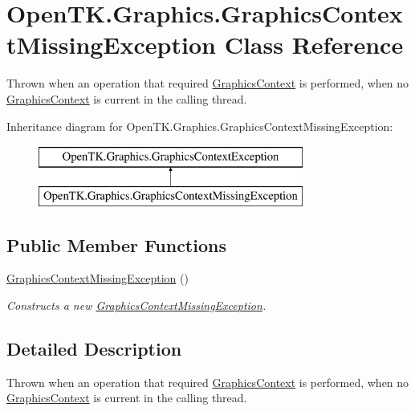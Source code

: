 \hypertarget{class_open_t_k_1_1_graphics_1_1_graphics_context_missing_exception}{\section{Open\-T\-K.\-Graphics.\-Graphics\-Context\-Missing\-Exception Class Reference}
\label{class_open_t_k_1_1_graphics_1_1_graphics_context_missing_exception}
}


Thrown when an operation that required \hyperlink{class_open_t_k_1_1_graphics_1_1_graphics_context}{Graphics\-Context} is performed, when no \hyperlink{class_open_t_k_1_1_graphics_1_1_graphics_context}{Graphics\-Context} is current in the calling thread.  


Inheritance diagram for Open\-T\-K.\-Graphics.\-Graphics\-Context\-Missing\-Exception\-:\begin{figure}[H]
\begin{center}
\leavevmode
\includegraphics[height=2.000000cm]{class_open_t_k_1_1_graphics_1_1_graphics_context_missing_exception}
\end{center}
\end{figure}
\subsection*{Public Member Functions}
\begin{DoxyCompactItemize}
\item 
\hyperlink{class_open_t_k_1_1_graphics_1_1_graphics_context_missing_exception_a73d119ac3bedb08eaf7daa5a22c4938e}{Graphics\-Context\-Missing\-Exception} ()
\begin{DoxyCompactList}\small\item\em Constructs a new \hyperlink{class_open_t_k_1_1_graphics_1_1_graphics_context_missing_exception}{Graphics\-Context\-Missing\-Exception}. \end{DoxyCompactList}\end{DoxyCompactItemize}


\subsection{Detailed Description}
Thrown when an operation that required \hyperlink{class_open_t_k_1_1_graphics_1_1_graphics_context}{Graphics\-Context} is performed, when no \hyperlink{class_open_t_k_1_1_graphics_1_1_graphics_context}{Graphics\-Context} is current in the calling thread. 



